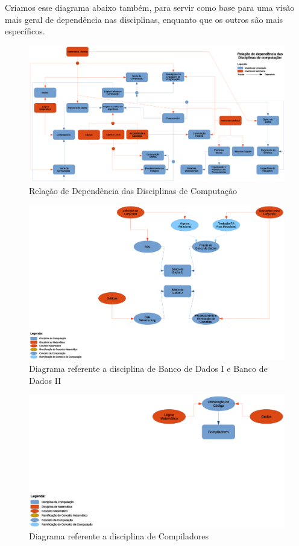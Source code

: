 \documentclass[12pt,a4paper]{article}
\begin{document}
Criamos esse diagrama abaixo também, para servir como base para uma visão mais geral de dependência nas disciplinas, enquanto que os outros são mais específicos.

\begin{figure}[htb]
	\centering
	\includegraphics[scale=0.31]{imagens/Geral.eps} 
	\flushleft
	\caption{Relação de Dependência das Disciplinas de Computação}
	\label{fig:diagramaDependenciaDisciplinas}
\end{figure}

\begin{figure}[htb]
	\centering
	\includegraphics[scale=0.35]{imagens/BD2.eps} 
	\flushleft
	\caption{Diagrama referente a disciplina de Banco de Dados I e Banco de Dados II}
	\label{fig:diagramaBD2}
\end{figure}
	
\begin{figure}[htb]
	\centering
	\includegraphics[scale=0.35]{imagens/Compiladores.eps} 
	\flushleft
	\caption{Diagrama referente a disciplina de Compiladores}
	\label{fig:diagramaCompiladores}
\end{figure}
\end{document}
